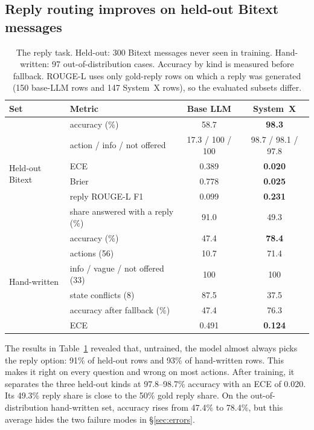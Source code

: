 \documentclass[11pt]{article}
\begin{document}
\subsection{Reply routing improves on held-out Bitext messages}

\begin{table}[t]
\centering
\caption{The reply task. Held-out: 300 Bitext messages never seen in training. Hand-written: 97 out-of-distribution cases. Accuracy by kind is measured before fallback. ROUGE-L uses only gold-reply rows on which a reply was generated (150 base-LLM rows and 147 System~X rows), so the evaluated subsets differ.}
\label{tab:reply}
\small
\begin{tabular}{llcc}
\toprule
Set & Metric & Base LLM & System~X \\
\midrule
\multirow{6}{*}{Held-out Bitext}
& accuracy (\%) & 58.7 & \textbf{98.3} \\
& \quad action / info / not offered & 17.3 / 100 / 100 & 98.7 / 98.1 / 97.8 \\
& ECE & 0.389 & \textbf{0.020} \\
& Brier & 0.778 & \textbf{0.025} \\
& reply ROUGE-L F1 & 0.099 & \textbf{0.231} \\
& share answered with a reply (\%) & 91.0 & 49.3 \\
\midrule
\multirow{6}{*}{Hand-written}
& accuracy (\%) & 47.4 & \textbf{78.4} \\
& \quad actions (56) & 10.7 & 71.4 \\
& \quad info / vague / not offered (33) & 100 & 100 \\
& \quad state conflicts (8) & 87.5 & 37.5 \\
& accuracy after fallback (\%) & 47.4 & 76.3 \\
& ECE & 0.491 & \textbf{0.124} \\
\bottomrule
\end{tabular}
\end{table}

The results in Table~\ref{tab:reply} revealed that, untrained, the model almost always picks the reply option: 91\% of held-out rows and 93\% of hand-written rows. This makes it right on every question and wrong on most actions. After training, it separates the three held-out kinds at 97.8--98.7\% accuracy with an ECE of 0.020. Its 49.3\% reply share is close to the 50\% gold reply share. On the out-of-distribution hand-written set, accuracy rises from 47.4\% to 78.4\%, but this average hides the two failure modes in \S\ref{sec:errors}.
\end{document}
